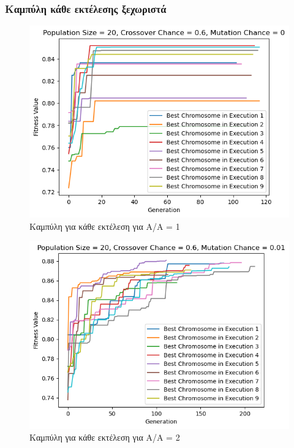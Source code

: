 \documentclass[12pt,a4paper]{article}
\begin{document}
\subsubsection{Καμπύλη κάθε εκτέλεσης ξεχωριστά}
\begin{figure}[H]
	\includegraphics[width=\textwidth]{Figures/2. All for AA = 1.png}
	\caption{Καμπύλη για κάθε εκτέλεση για A/A = 1}
\end{figure}

\begin{figure}[H]
	\includegraphics[width=\textwidth]{Figures/4. All for AA = 2.png}
	\caption{Καμπύλη για κάθε εκτέλεση για A/A = 2}
\end{figure}
\end{document}

